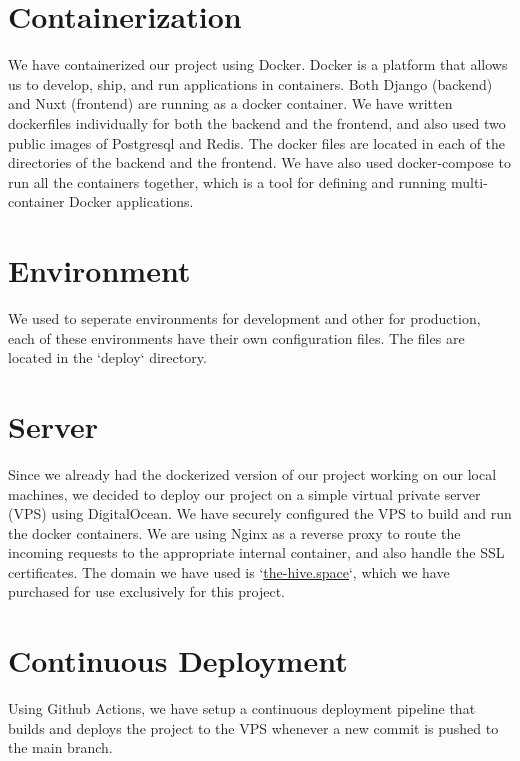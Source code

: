 \section{Containerization}
We have containerized our project using Docker. Docker is a platform that allows us to develop, ship, and run applications in containers.
Both Django (backend) and Nuxt (frontend) are running as a docker container.
We have written dockerfiles individually for both the backend and the frontend, and also used two public images of Postgresql and Redis.
The docker files are located in each of the directories of the backend and the frontend.
We have also used docker-compose to run all the containers together, which is a tool for defining and running multi-container Docker applications.

\section{Environment}
We used to seperate environments for development and other for production, each of these environments have their own configuration files.
The files are located in the `deploy` directory.


\section{Server}
Since we already had the dockerized version of our project working on our local machines, we decided to deploy our project on a simple virtual private server (VPS) using DigitalOcean.
We have securely configured the VPS to build and run the docker containers.
We are using Nginx as a reverse proxy to route the incoming requests to the appropriate internal container, and also handle the SSL certificates.
The domain we have used is `\url{the-hive.space}`, which we have purchased for use exclusively for this project.

\section{Continuous Deployment}
Using Github Actions, we have setup a continuous deployment pipeline that builds and deploys the project to the VPS whenever a new commit is pushed to the main branch.
